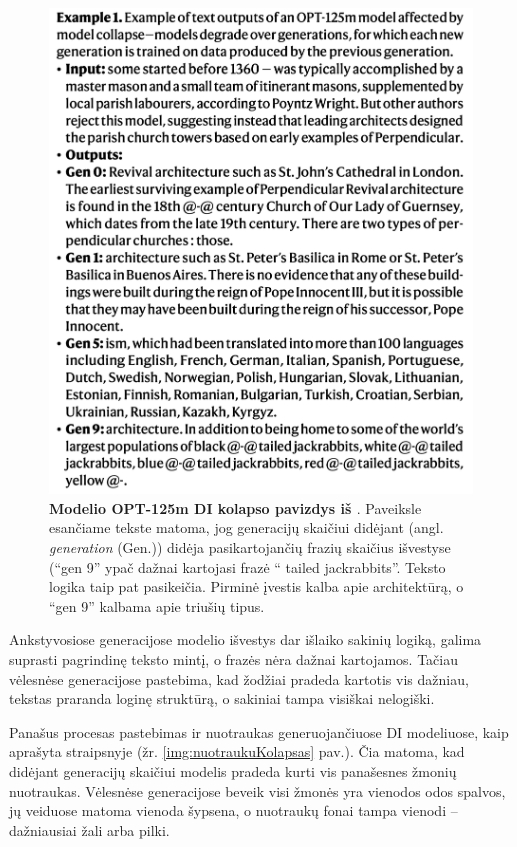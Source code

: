 \documentclass{VUMIFInfKursinis}
\begin{document}
\begin{figure}[H]
    \centering
    \includegraphics[scale=0.5]{img/natureTextCollapse.png}
    \caption{\textbf{Modelio OPT-125m DI kolapso pavizdys iš \cite{AICollapseNature}}. Paveiksle esančiame tekste matoma, jog generacijų skaičiui didėjant (angl. \textsl{generation} (Gen.)) didėja pasikartojančių frazių skaičius išvestyse (\enquote{gen 9} ypač dažnai kartojasi frazė \enquote{ tailed jackrabbits}. Teksto logika taip pat pasikeičia. Pirminė įvestis kalba apie architektūrą, o \enquote{gen 9} kalbama apie triušių tipus.}  
    \label{img:textCollapse}
\end{figure}


Ankstyvosiose generacijose modelio išvestys dar išlaiko sakinių logiką, galima suprasti pagrindinę teksto mintį, o frazės nėra dažnai kartojamos. Tačiau vėlesnėse generacijose pastebima, kad žodžiai pradeda kartotis vis dažniau, tekstas praranda loginę struktūrą, o sakiniai tampa visiškai nelogiški.

Panašus procesas pastebimas ir nuotraukas generuojančiuose DI modeliuose, kaip aprašyta straipsnyje \cite{ModelsGoMAD} (žr. \ref{img:nuotraukuKolapsas} pav.). Čia matoma, kad didėjant generacijų skaičiui modelis pradeda kurti vis panašesnes žmonių nuotraukas. Vėlesnėse generacijose beveik visi žmonės yra vienodos odos spalvos, jų veiduose matoma vienoda šypsena, o nuotraukų fonai tampa vienodi – dažniausiai žali arba pilki. 
\end{document}
